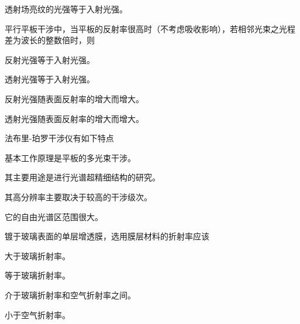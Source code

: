 \documentclass[standard, analysis, notocnum]{ExBook}
\newcommand{\answerarea}[1][8cm]{%
  \par\vspace{2mm}%
  \noindent{\color{themeColor!35}\rule{\linewidth}{0.4pt}}\par
  \noindent\begin{minipage}[t][#1][t]{\linewidth}\vspace{0pt}\end{minipage}\par
  \noindent{\color{themeColor!35}\rule{\linewidth}{0.4pt}}\par
}
\begin{document}
\begin{qitems}
\begin{bbox}
\par\noindent\hspace{2em}透射场亮纹的光强等于入射光强。
\answerarea[3.5cm]
\end{bbox}
\begin{bbox}
\qitem 平行平板干涉中，当平板的反射率很高时（不考虑吸收影响），若相邻光束之光程差为波长的整数倍时，则
\par\noindent\hspace{2em}反射光强等于入射光强。
\par\noindent\hspace{2em}透射光强等于入射光强。
\par\noindent\hspace{2em}反射光强随表面反射率的增大而增大。
\par\noindent\hspace{2em}透射光强随表面反射率的增大而增大。
\answerarea[3.5cm]
\end{bbox}
\begin{bbox}
\qitem 法布里-珀罗干涉仪有如下特点
\par\noindent\hspace{2em}基本工作原理是平板的多光束干涉。
\par\noindent\hspace{2em}其主要用途是进行光谱超精细结构的研究。
\par\noindent\hspace{2em}其高分辨率主要取决于较高的干涉级次。
\par\noindent\hspace{2em}它的自由光谱区范围很大。
\answerarea[3.5cm]
\end{bbox}
\begin{bbox}
\qitem 镀于玻璃表面的单层增透膜，选用膜层材料的折射率应该
\par\noindent\hspace{2em}大于玻璃折射率。
\par\noindent\hspace{2em}等于玻璃折射率。
\par\noindent\hspace{2em}介于玻璃折射率和空气折射率之间。
\par\noindent\hspace{2em}小于空气折射率。
\answerarea[3.5cm]
\end{bbox}
\end{qitems}
\end{document}
